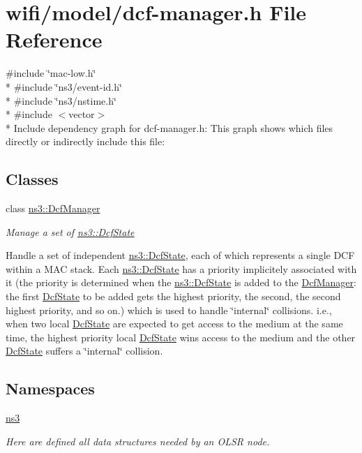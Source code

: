 \hypertarget{dcf-manager_8h}{}\section{wifi/model/dcf-\/manager.h File Reference}
\label{dcf-manager_8h}
{\ttfamily \#include \char`\"{}mac-\/low.\+h\char`\"{}}\\*
{\ttfamily \#include \char`\"{}ns3/event-\/id.\+h\char`\"{}}\\*
{\ttfamily \#include \char`\"{}ns3/nstime.\+h\char`\"{}}\\*
{\ttfamily \#include $<$vector$>$}\\*
Include dependency graph for dcf-\/manager.h\+:
This graph shows which files directly or indirectly include this file\+:
\subsection*{Classes}
\begin{DoxyCompactItemize}
\item 
class \hyperlink{classns3_1_1DcfManager}{ns3\+::\+Dcf\+Manager}
\begin{DoxyCompactList}\small\item\em Manage a set of \hyperlink{classns3_1_1DcfState}{ns3\+::\+Dcf\+State}

Handle a set of independent \hyperlink{classns3_1_1DcfState}{ns3\+::\+Dcf\+State}, each of which represents a single D\+CF within a M\+AC stack. Each \hyperlink{classns3_1_1DcfState}{ns3\+::\+Dcf\+State} has a priority implicitely associated with it (the priority is determined when the \hyperlink{classns3_1_1DcfState}{ns3\+::\+Dcf\+State} is added to the \hyperlink{classns3_1_1DcfManager}{Dcf\+Manager}\+: the first \hyperlink{classns3_1_1DcfState}{Dcf\+State} to be added gets the highest priority, the second, the second highest priority, and so on.) which is used to handle \char`\"{}internal\char`\"{} collisions. i.\+e., when two local \hyperlink{classns3_1_1DcfState}{Dcf\+State} are expected to get access to the medium at the same time, the highest priority local \hyperlink{classns3_1_1DcfState}{Dcf\+State} wins access to the medium and the other \hyperlink{classns3_1_1DcfState}{Dcf\+State} suffers a \char`\"{}internal\char`\"{} collision. \end{DoxyCompactList}\end{DoxyCompactItemize}
\subsection*{Namespaces}
\begin{DoxyCompactItemize}
\item 
 \hyperlink{namespacens3}{ns3}
\begin{DoxyCompactList}\small\item\em Here are defined all data structures needed by an O\+L\+SR node. \end{DoxyCompactList}\end{DoxyCompactItemize}
